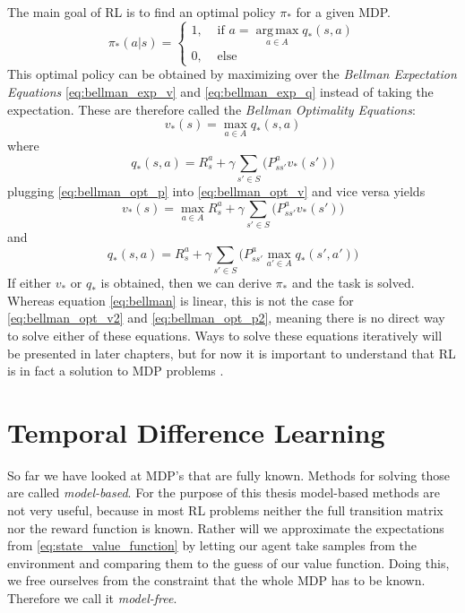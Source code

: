 The main goal of RL is to find an optimal policy $\pi_*$ for a given MDP.
\begin{equation} \label{eq:policy_opt}
	\pi_{*}(a|s) =
	\begin{cases}
		1,& \text{  if  } a = {\displaystyle \operatorname*{arg\,max}_{a \in A} q_{*}(s,a)}\\
		0,& \text{  else  }
	\end{cases}
\end{equation}
This optimal policy can be obtained by maximizing over the \emph{Bellman Expectation Equations} \ref{eq:bellman_exp_v} and \ref{eq:bellman_exp_q} instead of taking the expectation.
These are therefore called the \emph{Bellman Optimality Equations}:
\begin{equation} \label{eq:bellman_opt_v}
	v_{*}(s) = \max_{a \in A} q_{*}(s,a)
\end{equation}
where
\begin{equation} \label{eq:bellman_opt_p}
	q_{*}(s,a) = R_{s}^a + \gamma \sum_{s' \in S} \Big(P_{ss'}^a v_{*}(s')\Big)
\end{equation}
plugging \ref{eq:bellman_opt_p} into \ref{eq:bellman_opt_v} and vice versa yields
\begin{equation} \label{eq:bellman_opt_v2}
	v_{*}(s) = \max_{a \in A} R_{s}^a + \gamma \sum_{s' \in S} \Big(P_{ss'}^a v_{*}(s')\Big)
\end{equation}
and
\begin{equation} \label{eq:bellman_opt_p2}
	q_{*}(s,a) = R_{s}^a + \gamma \sum_{s' \in S} \Big(P_{ss'}^a \max_{a' \in A} q_{*}(s',a')\Big)
\end{equation}
If either $v_{*}$ or $q_{*}$ is obtained, then we can derive $\pi_*$ and the task is solved.
Whereas equation \ref{eq:bellman} is linear, this is not the case for \ref{eq:bellman_opt_v2} and \ref{eq:bellman_opt_p2}, meaning there is no direct way to solve either of these equations.
Ways to solve these equations iteratively will be presented in later chapters, but for now it is important to understand that RL is in fact a solution to MDP problems \cite{modelbasedmodelfree}.


\section{Temporal Difference Learning}
\label{temp_diff}

So far we have looked at MDP's that are fully known. Methods for solving those are called \emph{model-based}.
For the purpose of this thesis model-based methods are not very useful, because in most RL problems neither the full transition matrix nor the reward function is known.
Rather will we approximate the expectations from \ref{eq:state_value_function} by letting our agent take samples from the environment and comparing them to the guess of our value function.
Doing this, we free ourselves from the constraint that the whole MDP has to be known.
Therefore we call it \emph{model-free}.


